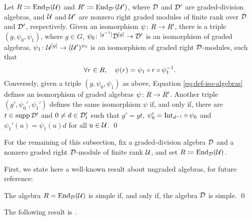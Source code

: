 \begin{thm}\label{thm:iso-abstract}
	Let $R \coloneqq \operatorname{End}_{\mathcal{D}}(\mathcal U)$ and $R' \coloneqq \operatorname{End}_{\mathcal{D}'}(\mathcal U')$, where $\mathcal{D}$ and $\mathcal{D}'$ are graded-division algebras, and $\mathcal U$ and $\mathcal U'$ are nonzero right graded modules of finite rank over $\mathcal{D}$ and $\mathcal{D}'$, respectively.
	Given an isomorphism $\psi\colon R \to R'$, there is a triple $(g, \psi_0, \psi_1)$, where $g \in G$, $\psi_0\colon {}^{[g^{-1}]}\mathcal{D}^{[g]} \to \mathcal{D}'$ is an isomorphism of graded algebras, $\psi_1\colon \mathcal U^{[g]} \to (\mathcal U')^{\psi_0}$ is an isomorphism of graded right $\mathcal{D}$-modules, such that
	\begin{equation}\label{eq:def-iso-algebras}
		\forall r\in R, \quad \psi(r) = \psi_1 \circ r \circ \psi_1^{-1}.
	\end{equation}
	Conversely, given a triple $(g, \psi_0, \psi_1)$ as above, Equation \eqref{eq:def-iso-algebras} defines an isomorphism of graded algebras $\psi\colon R \to R'$.
	Another triple $(g', \psi_0', \psi_1')$ defines the same isomorphism $\psi$ if, and only if, there are $t\in \operatorname{supp} \mathcal{D}'$ and $0 \neq d\in \mathcal{D}'_t$ such that $g'= gt$, $\psi_0' = \mathrm{Int}_{d^{-1}} \circ \psi_0$ and $\psi_1' (u) = \psi_1 (u) d$ for all $u \in \mathcal U$. \qed
\end{thm}

For the remaining of this subsection, fix a graded-division algebra $\mathcal{D}$ and a nonzero graded right $\mathcal{D}$-module of finite rank $\mathcal U$, and set $R \coloneqq \operatorname{End}_{\mathcal{D}} (\mathcal U)$. 

First, we state here a well-known result about ungraded algebras, for future reference:

\begin{prop}\label{prop:R-simple-iff-D-simple}
	The algebra $R = \operatorname{End}_{\mathcal{D}} (\mathcal U)$ is simple if, and only if, the algebra $\mathcal{D}$ is simple. \qed
\end{prop}


The following result is \cite[Exercise 3 on page 60]{livromicha}.

